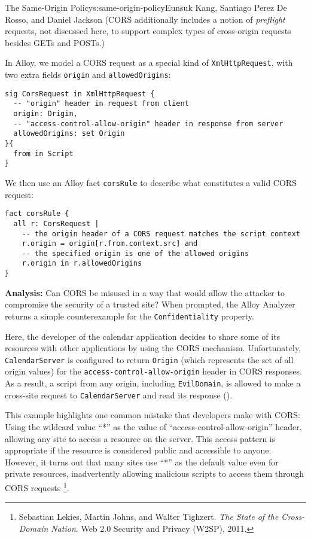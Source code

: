 \begin{aosachapter}{The Same-Origin Policy}{s:same-origin-policy}{Eunsuk Kang, Santiago Perez De Rosso, and Daniel Jackson}
(CORS additionally includes a notion of \emph{preflight} requests, not
discussed here, to support complex types of cross-origin requests
besides GETs and POSTs.)

In Alloy, we model a CORS request as a special kind of
\texttt{XmlHttpRequest}, with two extra fields \texttt{origin} and
\texttt{allowedOrigins}:

\begin{verbatim}
sig CorsRequest in XmlHttpRequest {
  -- "origin" header in request from client
  origin: Origin,
  -- "access-control-allow-origin" header in response from server
  allowedOrigins: set Origin
}{
  from in Script
}
\end{verbatim}

We then use an Alloy fact \texttt{corsRule} to describe what constitutes
a valid CORS request:

\begin{verbatim}
fact corsRule {
  all r: CorsRequest |
    -- the origin header of a CORS request matches the script context
    r.origin = origin[r.from.context.src] and
    -- the specified origin is one of the allowed origins
    r.origin in r.allowedOrigins
}
\end{verbatim}

\textbf{Analysis:} Can CORS be misused in a way that would allow the
attacker to compromise the security of a trusted site? When prompted,
the Alloy Analyzer returns a simple counterexample for the
\texttt{Confidentiality} property.

Here, the developer of the calendar application decides to share some of
its resources with other applications by using the CORS mechanism.
Unfortunately, \texttt{CalendarServer} is configured to return
\texttt{Origin} (which represents the set of all origin values) for the
\texttt{access-control-allow-origin} header in CORS responses. As a
result, a script from any origin, including \texttt{EvilDomain}, is
allowed to make a cross-site request to \texttt{CalendarServer} and read
its response ().


This example highlights one common mistake that developers make with
CORS: Using the wildcard value ``*'' as the value of
``access-control-allow-origin'' header, allowing any site to access a
resource on the server. This access pattern is appropriate if the
resource is considered public and accessible to anyone. However, it
turns out that many sites use ``*'' as the default value even for
private resources, inadvertently allowing malicious scripts to access
them through CORS requests \footnote{Sebastian Lekies, Martin Johns, and
  Walter Tighzert. \emph{The State of the Cross-Domain Nation}. Web 2.0
  Security and Privacy (W2SP), 2011.}.


\end{aosachapter}
